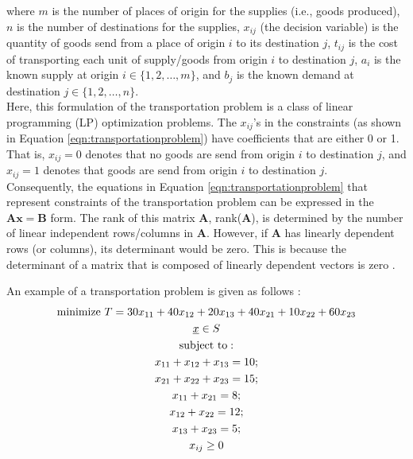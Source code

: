\documentclass[letter,12pt]{article}
\begin{document}
where $m$ is the number of places of origin for the supplies (i.e., goods produced), $n$ is the number of destinations for the supplies, $x_{ij}$ (the decision variable) is the quantity of goods send from a place of origin $i$ to its destination $j$, $t_{ij}$ is the cost of transporting each unit of supply/goods from origin $i$ to destination $j$, $a_{i}$ is the known supply at origin $i \in \{1, 2, \dots, m\}$, and $b_{j}$ is the known demand at destination $j \in \{1, 2, \dots, n\}$. \\

Here, this formulation of the transportation problem is a class of linear programming (LP) optimization problems. The $x_{ij}$'s in the constraints (as shown in Equation \ref{eqn:transportationproblem}) have coefficients that are either 0 or 1. That is, $x_{ij} = 0$ denotes that no goods are send from origin $i$ to destination $j$, and $x_{ij} = 1$ denotes that goods are send from origin $i$ to destination $j$. \\

Consequently, the equations in Equation \ref{eqn:transportationproblem} that represent constraints of the transportation problem can be expressed in the $\mathbf{Ax = B}$ form. The rank of this matrix $\mathbf{A}$, rank($\mathbf{A}$), is determined by the number of linear independent rows/columns in $\mathbf{A}$. However, if $\mathbf{A}$ has linearly dependent rows (or columns), its determinant would be zero. This is because the determinant of a matrix that is composed of linearly dependent vectors is zero \cite[\S5.3, Example 4]{Anton2005} \cite[\S3.2, pp. 171]{Lay2012} \cite[\S1.9.1, pp. 24]{Shilov1977} \cite[\S4.2, pp. 229]{Strang2006}.

An example of a transportation problem is given as follows \cite[\S8.4, pp.443--446]{Miller2000}:
\begin{eqnarray}
\label{eqn:transportationproblemexample}
	\begin{gathered}[b]
	{\rm minimize}\ T = 30x_{11} + 40x_{12} + 20x_{13} + 40x_{21} + 10x_{22} + 60x_{23} \\
	\underline{x} \in S \\
	{\rm subject\ to:} \\
	x_{11} + x_{12} + x_{13} = 10; \\
	x_{21} + x_{22} + x_{23} = 15; \\
	x_{11} + x_{21} = 8; \\
	x_{12} + x_{22} = 12; \\
	x_{13} + x_{23} = 5; \\
	x_{ij} \geq 0
	\end{gathered}
\end{eqnarray}
\end{document}
